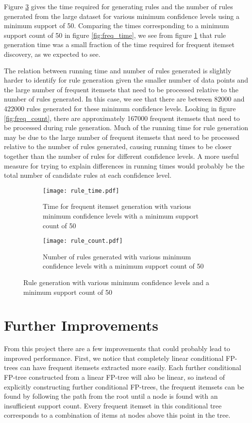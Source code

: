 \documentclass[11pt]{article}
\begin{document}
Figure \ref{fig:rule} gives the time required for generating rules and the number of rules generated from the large dataset for various minimum
confidence levels using a minimum support of 50. Comparing the times corresponding to a minimum support count of 50 in figure \ref{fig:freq_time}, we
see from figure \ref{fig:rule_time} that rule generation time was a small fraction of the time required for frequent itemset discovery, as we expected to
see.

The relation between running time and number of rules generated is slightly harder to identify for rule generation given the smaller number of data points
and the large number of frequent itemsets that need to be processed relative to the number of rules generated. In this case, we see that there
are between 82000 and 422000 rules generated for these minimum confidence levels. Looking in figure \ref{fig:freq_count}, there are approximately
167000 frequent itemsets that need to be processed during rule generation. Much of the running time for rule generation may be due to the large number
of frequent itemsets that need to be processed relative to the number of rules generated, causing running times to be closer together than the number
of rules for different confidence levels. A more useful measure for trying to explain differences in running times would probably be the total number
of candidate rules at each confidence level.

\begin{figure}[h!]
  \centering
  \begin{subfigure}[t]{0.45\textwidth}
    \centering
    \texttt{[image: rule\_time.pdf]}
    \caption{Time for frequent itemset generation with various minimum confidence levels with a minimum support count of 50}
    \label{fig:rule_time}
  \end{subfigure}
  \begin{subfigure}[t]{0.45\textwidth}
    \centering
    \texttt{[image: rule\_count.pdf]}
    \caption{Number of rules generated with various minimum confidence levels with a minimum support count of 50}
    \label{fig:rule_count}
  \end{subfigure}
  \caption{Rule generation with various minimum confidence levels and a minimum support count of 50}
  \label{fig:rule}
\end{figure}

\section{Further Improvements}
From this project there are a few improvements that could probably lead to improved performance. First, we notice that completely linear conditional
FP-trees can have frequent itemsets extracted more easily. Each further conditional FP-tree constructed from a linear FP-tree will also be linear, so
instead of explicitly constructing further conditional FP-trees, the frequent itemsets can be found by following the path from the root until a node
is found with an insufficient support count. Every frequent itemset in this conditional tree corresponds to a combination of items at nodes above this
point in the tree.
\end{document}
